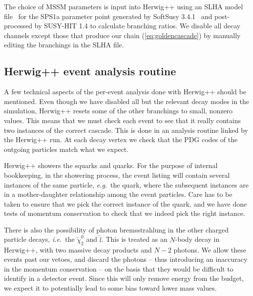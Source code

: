 \documentclass[twoside,english]{uiofysmaster}
\begin{document}
The choice of MSSM parameters is input into {\ttfamily Herwig++} using an SLHA model file~\cite{Skands:2003cj} for the SPS1a parameter point
generated by {\ttfamily SoftSusy 3.4.1}~\cite{Allanach:2001kg} and post-processed by {\ttfamily SUSY-HIT 1.4} \cite{Djouadi:2006bz} to calculate branching ratios. We disable all decay channels except those that produce our chain (\ref{eq:goldencascade}) by manually editing the branchings in the SLHA file. 

\subsection{{\ttfamily Herwig++} event analysis routine} 

A few technical aspects of the per-event analysis done with {\ttfamily Herwig++} should be mentioned. Even though we have disabled all but the relevant decay modes in the simulation, {\ttfamily Herwig++} resets some of the other branchings to small, nonzero values. This means that we must check each event to see that it really contains two instances of the correct cascade. This is done in an analysis routine linked by the {\ttfamily Herwig++} run. At each decay vertex we check that the PDG codes of the outgoing particles match what we expect.

{\ttfamily Herwig++} showers the squarks and quarks. For the purpose of internal bookkeeping, in the showering process, the event listing will contain several instances of the same particle, {\it e.g.}\ the quark, where the subsequent instances are in a mother-daughter relationship among the event particles. Care has to be taken to ensure that we pick the correct instance of the quark, and we have done tests of momentum conservation to check that we indeed pick the right instance.

There is also the possibility of photon bremsstrahlung in the other charged particle decays, {\it i.e.}\ the $\tilde \chi_2^0$ and $\tilde l$. This is treated as an $N$-body decay in {\ttfamily Herwig++}, with two massive decay products and $N-2$ photons. We allow these events past our vetoes, and discard the photons -- thus introducing an inaccuracy in the momentum conservation -- on the basis that they would be difficult to identify in a detector event. Since this will only remove energy from the budget, we expect it to potentially lead to some bias toward lower mass values. 
\end{document}
